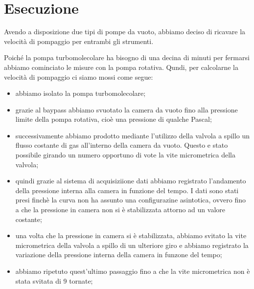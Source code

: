 \section{Esecuzione}

Avendo a disposizione due tipi di pompe da vuoto, abbiamo deciso di ricavare la velocità di pompaggio per entrambi gli strumenti.

Poiché la pompa turbomolecolare ha bisogno di una decina di minuti per fermarsi abbiamo cominciato le misure con la pompa rotativa. Qundi, per calcolarne la velocità di pompaggio ci siamo mossi come segue:

\begin{itemize}
	\item{abbiamo isolato la pompa turbomolecolare;}
	\item{grazie al baypass abbiamo svuotato la camera da vuoto fino alla pressione limite della pompa rotativa, cioè una pressione di qualche Pascal;}
	\item{successivamente abbiamo prodotto mediante l'utilizzo della valvola a spillo un flusso costante di gas all'interno della camera da vuoto. Questo e stato possibile girando un numero opportuno di vote la vite micrometrica della valvola;}
	\item{quindi grazie al sistema di acquisiziione dati abbiamo registrato l'andamento della pressione interna alla camera in funzione del tempo. I dati sono stati presi finchè la curva non ha assunto una configurazine asintotica, ovvero fino a che la pressione in camera non si è stabilizzata attorno ad un valore costante;}
	\item{una volta che la pressione in camera si è stabilizzata, abbiamo svitato la vite micrometrica della valvola a spillo di un ulteriore giro e abbiamo registrato la variazione della pressione interna della camera in funzone del tempo;}
	\item{abbiamo ripetuto quest'ultimo passaggio fino a che la vite micrometrica non è stata svitata di 9 tornate;} %
\end{itemize}

